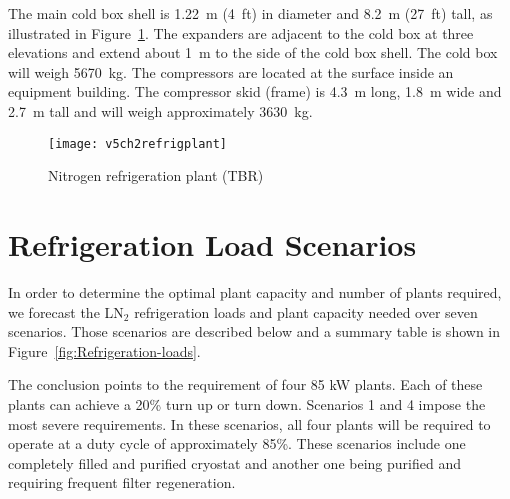 The main cold box shell is 1.22~m (4~ft) in diameter and 8.2~m (27~ft) tall, 
as illustrated in Figure~\ref{fig:nitrogren-refrigerator}. The expanders 
are adjacent to the cold box at three elevations and extend about 1~m to
the side of the cold box shell. The cold box will weigh 5670~kg. The 
compressors are located at the surface inside an equipment building. 
The compressor skid (frame) is 4.3~m long, 1.8~m wide and 2.7~m tall 
and will weigh approximately 3630~kg.  

\begin{figure}[htbp]
\centering
\texttt{[image: v5ch2refrigplant]}
\caption{Nitrogen refrigeration plant (TBR)}
\label{fig:nitrogren-refrigerator}
\end{figure}

\section{Refrigeration Load Scenarios}


In order to determine the optimal plant capacity and number of plants 
required, we forecast the LN$_2$ refrigeration loads and plant capacity
needed over seven scenarios.  Those scenarios are described below and 
a summary table is shown in Figure~\ref{fig:Refrigeration-loads}. 

The conclusion points to the requirement of four 85 kW plants. Each of 
these plants can achieve a 20\% turn up or turn down. Scenarios 1 and 4 
impose the most severe requirements. In these scenarios, all four plants 
will be required to operate at a duty cycle of approximately 85\%. These 
scenarios include one completely filled and purified cryostat and another 
one being purified and requiring frequent filter regeneration.

